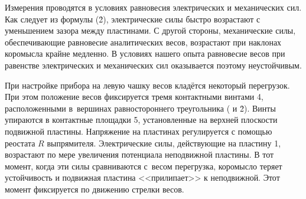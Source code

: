 Измерения проводятся в условиях равновесия электрических и механических сил. Как следует из формулы (\r{2}),
электрические силы быстро возрастают с уменьшением зазора между пластинами. С другой стороны, механические силы,
обеспечивающие равновесие аналитических весов, возрастают при наклонах коромысла крайне медленно. В условиях нашего
опыта равновесие весов при равенстве электрических и механических сил оказывается поэтому неустойчивым.

При настройке прибора на левую чашку весов кладётся некоторый перегрузок. При этом положение весов фиксируется тремя
контактными винтами 4, расположенными в~вершинах равностороннего треугольника ( и \r{2}). Винты упираются в
контактные площадки 5, установленные на верхней плоскости подвижной пластины. Напряжение на пластинах регулируется с
помощью реостата $R$ выпрямителя. Электрические силы, действующие на пластину 1, возрастают по мере увеличения
потенциала неподвижной пластины. В тот момент, когда эти силы сравниваются с~весом перегрузка, коромысло теряет
устойчивость и подвижная пластина <<прилипает>> к неподвижной. Этот момент фиксируется по движению стрелки весов.

